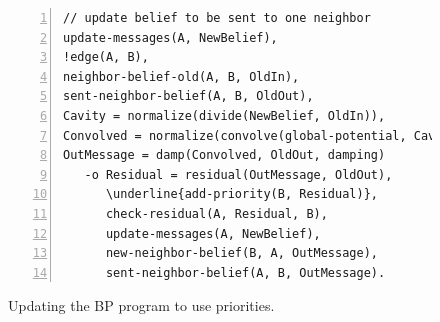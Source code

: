 \begin{figure}[h!]
\begin{Verbatim}[numbers=left,commandchars=\\\{\},fontsize=\codesize]
// update belief to be sent to one neighbor
update-messages(A, NewBelief),
!edge(A, B),
neighbor-belief-old(A, B, OldIn),
sent-neighbor-belief(A, B, OldOut),
Cavity = normalize(divide(NewBelief, OldIn)),
Convolved = normalize(convolve(global-potential, Cavity)),
OutMessage = damp(Convolved, OldOut, damping)
   -o Residual = residual(OutMessage, OldOut),
      \underline{add-priority(B, Residual)},
      check-residual(A, Residual, B),
      update-messages(A, NewBelief),
      new-neighbor-belief(B, A, OutMessage),
      sent-neighbor-belief(A, B, OutMessage).
\end{Verbatim}
\caption{Updating the BP program to use priorities.}
\label{code:coordination:improved_bp}
\end{figure}
